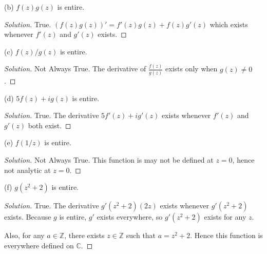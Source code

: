 \begin{enumerate}
(b) $f(z) g(z)$ is entire.
\begin{proof}[Solution]
	True. $\left( f(z)g(z) \right) ' = f'(z)g(z)+ f(z) g'(z)$ which exists whenever $f'(z)$ and $g'(z)$ exists.
\end{proof}

(c) $f(z) / g(z)$ is entire.
\begin{proof}[Solution]
	Not Always True. The derivative of $\frac{f(z)}{g(z)}$ exists only when $g(z)\neq 0$.
\end{proof}

(d) $5 f(z)+i g(z)$ is entire.
\begin{proof}[Solution]
	True. The derivative $5f'(z) + i g'(z)$ exists whenever $f'(z)$ and $g'(z)$ both exist.
\end{proof}

(e) $f(1 / z)$ is entire.
\begin{proof}[Solution]
	Not Always True. This function is may not be defined at $z = 0$, hence not analytic at $z = 0$.
\end{proof}

(f) $g\left(z^2+2\right)$ is entire.
\begin{proof}[Solution]
	True. The derivative $g'(z^2+2)(2z)$ exists whenever  $g'(z^2 +2)$ exists. Because $g$ is entire, $g'$ exists everywhere, so $g'(z^2+2)$ exists for any $z$.

	Also, for any $a \in \mathbb{Z}$, there exists $z \in \mathbb{Z}$ such that $a = z^2 + 2$. Hence this function is everywhere defined on $\mathbb{C}$.
\end{proof}

\end{enumerate}
